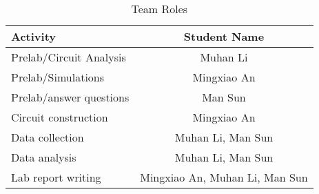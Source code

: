 
\begin{table}[!htbp]
	\caption{Team Roles}
	\renewcommand\arraystretch{1.5}\centering
	\begin{tabular}{l|c}
		\hline
		\hline
		Activity					&	Student Name 	\\
		\hline
		Prelab/Circuit Analysis		& 	Muhan Li		\\
		\hline
		Prelab/Simulations			&	Mingxiao An		\\
		\hline
		Prelab/answer questions		&	Man Sun			\\
		\hline
		Circuit construction		&	Mingxiao An		\\
		\hline
		Data collection				& Muhan Li, Man Sun	\\
		\hline
		Data analysis				& Muhan Li, Man Sun \\
		\hline
		Lab report writing			& Mingxiao An, Muhan Li, Man Sun \\
		\hline
		\hline
	\end{tabular}\\
\end{table}